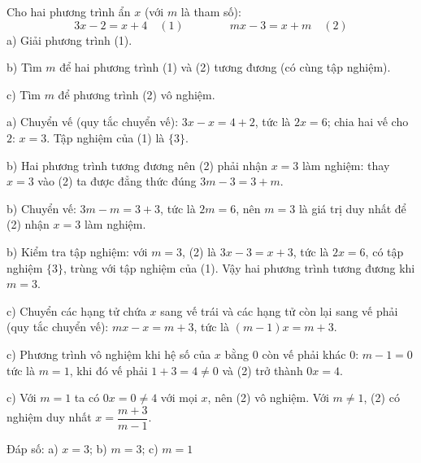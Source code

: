 \begin{problem}[8DS-PT1-046]
Cho hai phương trình ẩn $x$ (với $m$ là tham số):
\[ 3x - 2 = x + 4 \quad (1) \qquad\qquad mx - 3 = x + m \quad (2) \]
a) Giải phương trình (1).

b) Tìm $m$ để hai phương trình (1) và (2) tương đương (có cùng tập nghiệm).

c) Tìm $m$ để phương trình (2) vô nghiệm.

\begin{solution}
a) Chuyển vế (quy tắc chuyển vế): $3x - x = 4 + 2$, tức là $2x = 6$; chia hai vế cho $2$: $x = 3$. Tập nghiệm của (1) là $\{3\}$.

b) Hai phương trình tương đương nên (2) phải nhận $x = 3$ làm nghiệm: thay $x = 3$ vào (2) ta được đẳng thức đúng $3m - 3 = 3 + m$.

b) Chuyển vế: $3m - m = 3 + 3$, tức là $2m = 6$, nên $m = 3$ là giá trị duy nhất để (2) nhận $x = 3$ làm nghiệm.

b) Kiểm tra tập nghiệm: với $m = 3$, (2) là $3x - 3 = x + 3$, tức là $2x = 6$, có tập nghiệm $\{3\}$, trùng với tập nghiệm của (1). Vậy hai phương trình tương đương khi $m = 3$.

c) Chuyển các hạng tử chứa $x$ sang vế trái và các hạng tử còn lại sang vế phải (quy tắc chuyển vế): $mx - x = m + 3$, tức là $(m - 1)x = m + 3$.

c) Phương trình vô nghiệm khi hệ số của $x$ bằng $0$ còn vế phải khác $0$: $m - 1 = 0$ tức là $m = 1$, khi đó vế phải $1 + 3 = 4 \neq 0$ và (2) trở thành $0x = 4$.

c) Với $m = 1$ ta có $0x = 0 \neq 4$ với mọi $x$, nên (2) vô nghiệm. Với $m \neq 1$, (2) có nghiệm duy nhất $x = \dfrac{m + 3}{m - 1}$.

Đáp số: a) $\boxed{x = 3}$; b) $\boxed{m = 3}$; c) $\boxed{m = 1}$
\end{solution}
\end{problem}

